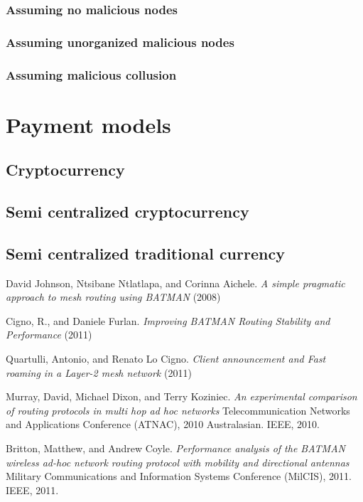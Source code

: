 \documentclass[11pt]{article}
\begin{document}
	    \subsubsection{Assuming no malicious nodes}
	    \subsubsection{Assuming unorganized malicious nodes}
	    \subsubsection{Assuming malicious collusion}

\section{Payment models}

    \subsection{Cryptocurrency}
    \subsection{Semi centralized cryptocurrency}
    \subsection{Semi centralized traditional currency}

\medskip


\begin{thebibliography}{1}



David Johnson, Ntsibane Ntlatlapa, and Corinna Aichele.
\textit{A simple pragmatic approach to mesh routing using BATMAN} (2008)

Cigno, R., and Daniele Furlan.
\textit{Improving BATMAN Routing Stability and Performance} (2011)

Quartulli, Antonio, and Renato Lo Cigno.
\textit{Client announcement and Fast roaming in a Layer-2 mesh network} (2011)

Murray, David, Michael Dixon, and Terry Koziniec.
\textit{An experimental comparison of routing protocols in multi hop ad hoc networks} Telecommunication Networks and Applications Conference (ATNAC), 2010 Australasian. IEEE, 2010.

Britton, Matthew, and Andrew Coyle.
\textit{Performance analysis of the BATMAN wireless ad-hoc network routing protocol with mobility and directional antennas} Military Communications and Information Systems Conference (MilCIS), 2011. IEEE, 2011.

\end{thebibliography}
\end{document}
